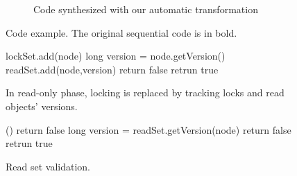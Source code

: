 \begin{figure*}
\begin{center}
\begin{subfigure}{.49\textwidth}
\begin{algorithmic}[1]{}
{			\EndFunction
			}
		\end{algorithmic}
		\caption{ Code synthesized with our
		automatic transformation}\label{figure:transformation:after}
	\end{subfigure}
	\end{center}
	\caption{Code example. 
	The original sequential code
	is in bold.
			\label{figure:transformation}}
\end{figure*}

\begin{figure}
\begin{algorithmic}[1]{}
		{\ttfamily
		\State lockSet.add(node) \label{code:lockedSet:add}
			\State long version = node.getVersion() \label{code:track:getVersion}
			\State readSet.add(node,version)  
				\State return false \label{code:track:returnFalse}
			\EndIf
			\State retrun true
		\EndFunction
		}
\end{algorithmic}
\caption{ In read-only phase, locking is replaced by 
tracking locks and read
objects' versions.
\label{figure::track}}
\end{figure}

\begin{figure}
\begin{algorithmic}[1]{}
		{\ttfamily
		()
				\State return false
			\EndIf
			\State long version = readSet.getVersion(node)
				\State return false
			\EndIf
		\EndFor
		\State retrun true
		\EndFunction
		}
\end{algorithmic}
\caption{Read set validation.\label{figure::validate}}
\end{figure}


